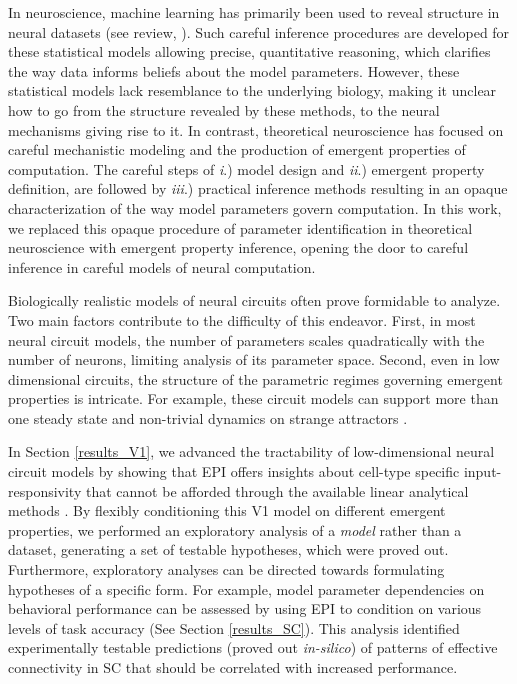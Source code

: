 \documentclass[11pt]{article}
\begin{document}
In neuroscience, machine learning has primarily been used to reveal structure in neural datasets \cite{kass2001spike, brown1998statistical, paninski2004maximum, truccolo2005point, druckmann2007novel, byron2009gaussian, park2011bayesian, latimer2015single, lakshminarasimhan2018dynamic, duncker2019learning, ladenbauer2019inferring} (see review, \cite{paninski2018neural}). 
 Such careful inference procedures are developed for these statistical models allowing precise, quantitative reasoning, which clarifies the way data informs beliefs about the model parameters.  
 However, these statistical models lack resemblance to the underlying biology, making it unclear how to go from the structure revealed by these methods, to the neural mechanisms giving rise to it. 
In contrast, theoretical neuroscience has focused on careful mechanistic modeling and the production of emergent properties of computation.  
The careful steps of \emph{i}.) model design and \emph{ii}.) emergent property definition, are followed by \emph{iii}.) practical inference methods resulting in an opaque characterization of the way model parameters govern computation.  
In this work, we replaced this opaque procedure of parameter identification in theoretical neuroscience with emergent property inference, opening the door to careful inference in careful models of neural computation.

Biologically realistic models of neural circuits often prove formidable to analyze.
Two main factors contribute to the difficulty of this endeavor.
First, in most neural circuit models, the number of parameters scales quadratically with the number of neurons, limiting analysis of its parameter space. 
Second, even in low dimensional circuits, the structure of the parametric regimes governing emergent properties is intricate.  
For example, these circuit models can support more than one steady state \cite{kraynyukova2018stabilized} and non-trivial dynamics on strange attractors \cite{morrison2016diversity}.

In Section \ref{results_V1}, we advanced the tractability of low-dimensional neural circuit models by showing that EPI offers insights about cell-type specific input-responsivity that cannot be afforded through the available linear analytical methods  \cite{litwin2016inhibitory, GarciaDelMolino2017, Chen2019}. 
By flexibly conditioning this V1 model on different emergent properties, we performed an exploratory analysis of a \emph{model} rather than a dataset, generating a set of testable hypotheses, which were proved out. 
Furthermore, exploratory analyses can be directed towards formulating hypotheses of a specific form. 
For example, model parameter dependencies on behavioral performance can be assessed by using EPI to condition on various levels of task accuracy (See Section \ref{results_SC}). 
This analysis identified experimentally testable predictions (proved out \textit{in-silico}) of patterns of effective connectivity in SC that should be correlated with increased performance.
\end{document}
